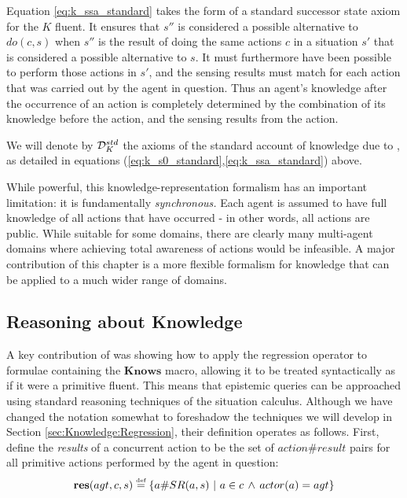 Equation \eqref{eq:k_ssa_standard} takes the form of a standard successor
state axiom for the $K$ fluent. It ensures that $s''$ is considered
a possible alternative to $do(c,s)$ when $s''$ is the result of
doing the same actions $c$ in a situation $s'$ that is considered
a possible alternative to $s$. It must furthermore have been possible
to perform those actions in $s'$, and the sensing results must match
for each action that was carried out by the agent in question. Thus
an agent's knowledge after the occurrence of an action is completely
determined by the combination of its knowledge before the action,
and the sensing results from the action.

\medskip{}


\begin{defn}
We will denote by $\mathcal{D}_{K}^{std}$ the axioms of the standard account
of knowledge due to \citep{scherl03sc_knowledge,scherl03conc_knowledge},
as detailed in equations (\ref{eq:k_s0_standard},\ref{eq:k_ssa_standard})
above. 
\end{defn}
While powerful, this knowledge-representation formalism has an important
limitation: it is fundamentally \emph{synchronous.} Each agent is
assumed to have full knowledge of all actions that have occurred -
in other words, all actions are public. While suitable for some domains,
there are clearly many multi-agent domains where achieving total awareness
of actions would be infeasible. A major contribution of this chapter
is a more flexible formalism for knowledge that can be applied to
a much wider range of domains.


\subsection{Reasoning about Knowledge}

A key contribution of \citet{scherl03sc_knowledge} was showing how
to apply the regression operator to formulae containing the $\mathbf{Knows}$
macro, allowing it to be treated syntactically as if it were a primitive
fluent. This means that epistemic queries can be approached using
standard reasoning techniques of the situation calculus. Although
we have changed the notation somewhat to foreshadow the techniques
we will develop in Section \ref{sec:Knowledge:Regression}, their
definition operates as follows. First, define the \emph{results} of
a concurrent action to be the set of $action\#result$ pairs for all
primitive actions performed by the agent in question:\[
\mathbf{res}(agt,c,s)\stackrel{\mbox{\tiny def}}{=}\{a\#SR(a,s)\,\,|\,\, a\in c\,\wedge\, actor(a)=agt\}\]



